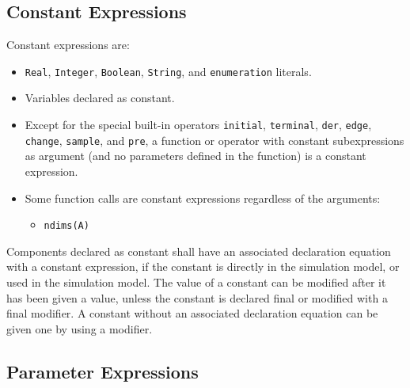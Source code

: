 \subsection{Constant Expressions}\label{constant-expressions}

Constant expressions are:
\begin{itemize}
\item
  \lstinline!Real!, \lstinline!Integer!, \lstinline!Boolean!, \lstinline!String!, and \lstinline!enumeration! literals.
\item
  Variables declared as constant.
\item
  Except for the special built-in operators \lstinline!initial!, \lstinline!terminal!, \lstinline!der!,
  \lstinline!edge!, \lstinline!change!, \lstinline!sample!, and \lstinline!pre!, a function or operator with constant
  subexpressions as argument (and no parameters defined in the function)
  is a constant expression.
\item
  Some function calls are constant expressions regardless of the arguments:
  \begin{itemize}
  \item
    \lstinline!ndims(A)!
  \end{itemize}
\end{itemize}

Components declared as constant shall have an associated declaration
equation with a constant expression, if the constant is directly in the
simulation model, or used in the simulation model. The value of a
constant can be modified after it has been given a value, unless the
constant is declared final or modified with a final modifier. A constant
without an associated declaration equation can be given one by using a
modifier.

\subsection{Parameter Expressions}\label{parameter-expressions}

